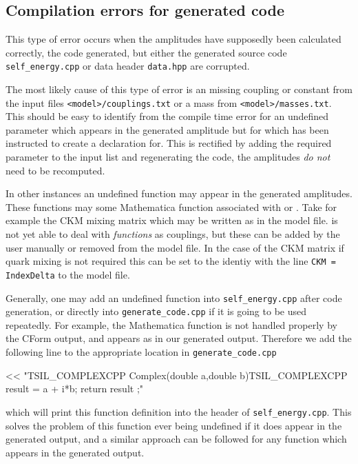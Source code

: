 \subsection{Compilation errors for generated code}

This type of error occurs when the amplitudes have supposedly been calculated correctly, the code generated, but either the generated source code \lstinline{self_energy.cpp} or data header \lstinline{data.hpp} are corrupted.

The most likely cause of this type of error is an missing coupling or constant from the input files \lstinline{<model>/couplings.txt} or a mass from \lstinline{<model>/masses.txt}.  This should be easy to identify from the compile time error for an undefined parameter which appears in the generated amplitude but for which \mb has been instructed to create a declaration for.  This is rectified by adding the required parameter to the input list and regenerating the code, the amplitudes \textit{do not} need to be recomputed.

In other instances an undefined function may appear in the generated amplitudes.  These functions may some Mathematica function associated with \feyncalc or \feynartss.  Take for example the CKM mixing matrix which may be written as  in the \feynarts model file.  \mb is not yet able to deal with \textit{functions} as couplings, but these can be added by the user manually or removed from the \feynarts model file.  In the case of the CKM matrix if quark mixing is not required this can be set to the identiy with the line \lstinline{CKM = IndexDelta} to the \feynarts model file.

Generally, one may add an undefined function into \lstinline{self_energy.cpp} after code generation, or directly into \lstinline{generate_code.cpp} if it is going to be used repeatedly.  For example, the Mathematica function  is not handled properly by the CForm output, and appears as  in our generated output.  Therefore we add the following line to the appropriate location in \lstinline{generate_code.cpp} 
\begin{lstterm}
<< "TSIL_COMPLEXCPP Complex(double a,double b){TSIL_COMPLEXCPP result = a + i*b; return result ;}\n"
\end{lstterm}
which will print this function definition into the header of \lstinline{self_energy.cpp}.  This solves the problem of this function ever being undefined if it does appear in the generated output, and a similar approach can be followed for any function which appears in the generated output.

